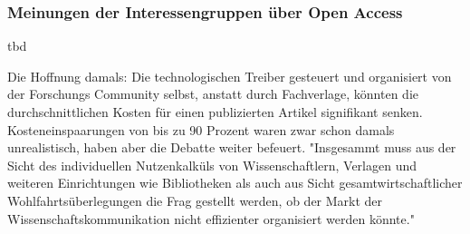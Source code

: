 \subsubsection{Meinungen der Interessengruppen über Open Access}
tbd

Die Hoffnung damals: Die technologischen Treiber gesteuert und organisiert von der Forschungs Community selbst, anstatt durch Fachverlage, könnten die durchschnittlichen Kosten für einen publizierten Artikel signifikant senken. Kosteneinspaarungen von bis zu 90 Prozent\cite{hilf_2004} waren zwar schon damals unrealistisch, haben aber die Debatte weiter befeuert. "Insgesammt muss aus der Sicht des individuellen Nutzenkalküls von Wissenschaftlern, Verlagen und weiteren Einrichtungen wie Bibliotheken als auch aus Sicht gesamtwirtschaftlicher Wohlfahrtsüberlegungen die Frag gestellt werden, ob der Markt der Wissenschaftskommunikation nicht effizienter organisiert werden könnte."\cite{Hess_2006}